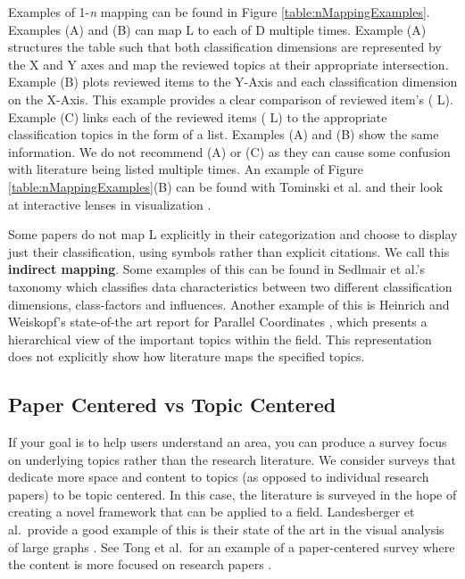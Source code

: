 Examples of 1-\textit{n} mapping can be found in Figure \ref{table:nMappingExamples}. Examples (A) and (B) can map {\color{blue} L} to each of {\color{red} D} multiple times. Example (A) structures the table such that both classification dimensions are represented by the X and Y axes and map the reviewed topics at their appropriate intersection. Example (B) plots reviewed items to the Y-Axis and each classification dimension on the X-Axis. This example provides a clear comparison of reviewed item's ({\color{blue} L}). Example (C) links each of the reviewed items ({\color{blue} L}) to the appropriate classification topics in the form of a list. Examples (A) and (B) show the same information.
We do not recommend (A) or (C) as they can cause some confusion with literature being listed multiple times. An example of Figure \ref{table:nMappingExamples}(B) can be found with Tominski et al. and their look at interactive lenses in visualization \cite{tominski2014survey}.

Some papers do not map {\color{blue} L} explicitly in their categorization and choose to display just their classification, using symbols rather than explicit citations. We call this \textbf{indirect mapping}. Some examples of this can be found in Sedlmair et al.'s  taxonomy \cite{sedlmair2012taxonomy} which classifies data characteristics between two different classification dimensions, class-factors and influences. Another example of this is Heinrich and Weiskopf's state-of-the art  report for Parallel Coordinates \cite{heinrich2013state}, which presents a hierarchical view of the important topics within the field. This representation does not explicitly show how literature maps the specified topics. 

\subsection{Paper Centered vs Topic Centered}
If your goal is to help users understand an area, you can produce a survey focus on underlying topics rather than the research literature. We consider surveys that dedicate more space and content to topics (as opposed to individual research papers) to be topic centered. In this case, the literature is surveyed in the hope of creating a novel framework that can be applied to a field. Landesberger et al.\ provide a good example of this  is their state of the art in the visual analysis of large graphs \cite{von2011visual}. See Tong et al.\ for an example of a paper-centered survey where the content is more focused on research papers \cite{tong2018storytelling}.

